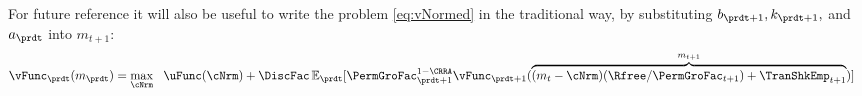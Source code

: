 For future reference it will also be useful to write the problem \eqref{eq:vNormed} in the traditional way, by substituting $b_{\prdt+1},k_{\prdt+1},$ and $a_{\prdt}$ into $m_{t+1}$:
\begin{equation}\begin{gathered}\begin{aligned}
      \vFunc_{\prdt}(m_{\prdt}) & = \max_{\cNrm} ~~ \uFunc(\cNrm)+ \DiscFac \Ex_{\prdt}[ \PermGroFac_{\prdt+1}^{1-\CRRA}\vFunc_{\prdt+1}(\overbrace{(m_{t}-\cNrm)(\Rfree/\PermGroFac_{t+1})+\TranShkEmp_{t+1}}^{m_{t+1}})] \label{eq:vusual}
    \end{aligned}\end{gathered}\end{equation}

